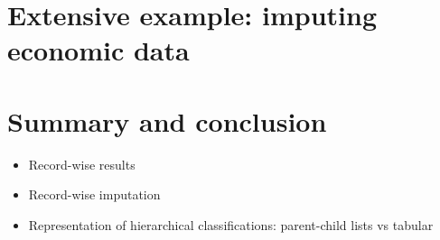 \documentclass[11pt, fleqn]{article}
\begin{document}
\section{Extensive example: imputing economic data}

\section{Summary and conclusion}

\begin{itemize}
\item{Record-wise results}
\item{Record-wise imputation}
\item{Representation of hierarchical classifications: parent-child lists vs tabular}
\end{itemize}



\end{document}

